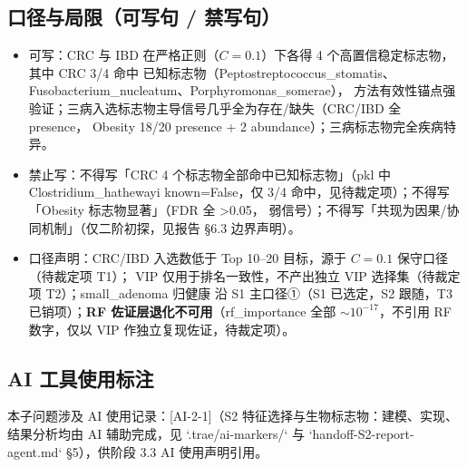 \documentclass{article}   %
\begin{document}
\subsection{口径与局限（可写句 / 禁写句）}

\begin{itemize}
  \item 可写：CRC 与 IBD 在严格正则（$C=0.1$）下各得 4 个高置信稳定标志物，其中 CRC 3/4 命中
        已知标志物（Peptostreptococcus\_stomatis、Fusobacterium\_nucleatum、Porphyromonas\_somerae），
        方法有效性锚点强验证；三病入选标志物主导信号几乎全为存在/缺失（CRC/IBD 全 presence，
        Obesity 18/20 presence + 2 abundance）；三病标志物完全疾病特异。
  \item 禁止写：不得写「CRC 4 个标志物全部命中已知标志物」（pkl 中 Clostridium\_hathewayi
        known=False，仅 3/4 命中，见待裁定项）；不得写「Obesity 标志物显著」（FDR 全 >0.05，
        弱信号）；不得写「共现为因果/协同机制」（仅二阶初探，见报告 §6.3 边界声明）。
  \item 口径声明：CRC/IBD 入选数低于 Top 10--20 目标，源于 $C=0.1$ 保守口径（待裁定项 T1）；
        VIP 仅用于排名一致性，不产出独立 VIP 选择集（待裁定项 T2）；small\_adenoma 归健康
        沿 S1 主口径①（S1 已选定，S2 跟随，T3 已销项）；\textbf{RF 佐证层退化不可用}（rf\_importance 全部
        $\sim10^{-17}$，不引用 RF 数字，仅以 VIP 作独立复现佐证，待裁定项）。
\end{itemize}

\subsection{AI 工具使用标注}

本子问题涉及 AI 使用记录：[AI-2-1]（S2 特征选择与生物标志物：建模、实现、结果分析均由 AI 辅助完成，见 `.trae/ai-markers/` 与 `handoff-S2-report-agent.md` §5），供阶段 3.3 AI 使用声明引用。
\end{document}
